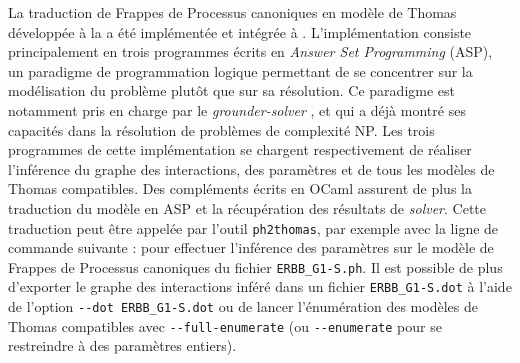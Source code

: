 La traduction de Frappes de Processus canoniques en modèle de Thomas développée
à la  a été implémentée et intégrée à \Pint.
L'implémentation consiste principalement en trois programmes
écrits en \textit{Answer Set Programming} (ASP),
un paradigme de programmation logique permettant de se concentrer sur la modélisation
du problème plutôt que sur sa résolution.
Ce paradigme est notamment pris en charge par le \textit{grounder-solver} ,
et qui a déjà montré ses capacités dans la résolution de problèmes de complexité NP.
Les trois programmes de cette implémentation se chargent respectivement
de réaliser l'inférence
du graphe des interactions, des paramètres et de tous les modèles de Thomas compatibles.
Des compléments écrits en OCaml assurent de plus la traduction du modèle en ASP
et la récupération des résultats de \textit{solver}.
Cette traduction peut être appelée par l'outil \texttt{ph2thomas}, par exemple avec la
ligne de commande suivante :
pour effectuer l'inférence des paramètres sur le modèle de Frappes de Processus canoniques
du fichier \texttt{ERBB\_G1-S.ph}.
Il est possible de plus d'exporter le graphe des interactions inféré dans un fichier
\texttt{ERBB\_G1-S.dot} à l'aide de l'option \texttt{-{}-dot ERBB\_G1-S.dot}
ou de lancer l'énumération des modèles de Thomas compatibles
avec \texttt{-{}-full-enumerate} (ou \texttt{-{}-enumerate} pour se restreindre
à des paramètres entiers).

